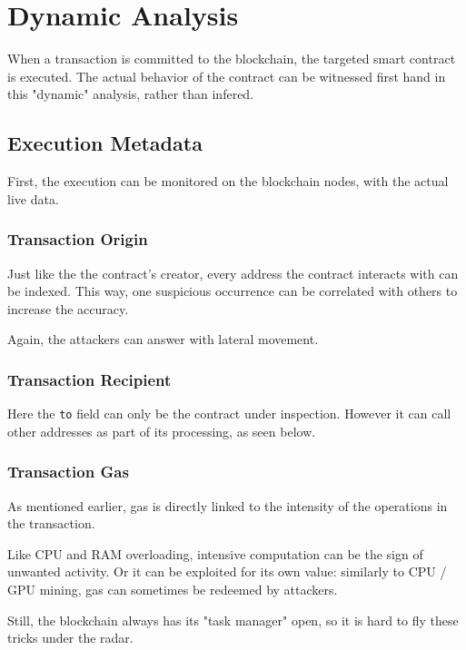 \section{Dynamic Analysis} \label{sec:data-dynamic}

When a transaction is committed to the blockchain, the targeted smart contract is executed.
The actual behavior of the contract can be witnessed first hand in this "dynamic" analysis, rather than infered.

\subsection{Execution Metadata}

First, the execution can be monitored on the blockchain nodes, with the actual live data.

\subsubsection{Transaction Origin}

Just like the the contract's creator, every address the contract interacts with can be indexed.
This way, one suspicious occurrence can be correlated with others to increase the accuracy.

Again, the attackers can answer with lateral movement.

\subsubsection{Transaction Recipient}

Here the \lstinline[language=Solidity]{to} field can only be the contract under inspection.
However it can call other addresses as part of its processing, as seen below.

\subsubsection{Transaction Gas}

As mentioned earlier, gas is directly linked to the intensity of the operations in the transaction.

Like CPU and RAM overloading, intensive computation can be the sign of unwanted activity.
Or it can be exploited for its own value: similarly to CPU / GPU mining, gas can sometimes be redeemed by attackers.

Still, the blockchain always has its "task manager" open, so it is hard to fly these tricks under the radar.


